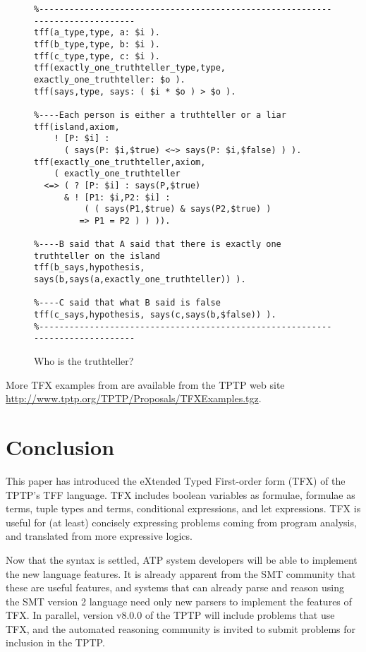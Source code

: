 \documentclass{easychair}
\begin{document}
\begin{figure}[htbp]
\begin{small}
\begin{verbatim}
%------------------------------------------------------------------------------
tff(a_type,type, a: $i ).
tff(b_type,type, b: $i ).
tff(c_type,type, c: $i ).
tff(exactly_one_truthteller_type,type, exactly_one_truthteller: $o ).
tff(says,type, says: ( $i * $o ) > $o ).

%----Each person is either a truthteller or a liar
tff(island,axiom,
    ! [P: $i] :
      ( says(P: $i,$true) <~> says(P: $i,$false) ) ).
tff(exactly_one_truthteller,axiom,
    ( exactly_one_truthteller
  <=> ( ? [P: $i] : says(P,$true)
      & ! [P1: $i,P2: $i] :
          ( ( says(P1,$true) & says(P2,$true) )
         => P1 = P2 ) ) )).

%----B said that A said that there is exactly one truthteller on the island
tff(b_says,hypothesis, says(b,says(a,exactly_one_truthteller)) ).

%----C said that what B said is false
tff(c_says,hypothesis, says(c,says(b,$false)) ).
%------------------------------------------------------------------------------
\end{verbatim}
\end{small}
\caption{Who is the truthteller?}
\label{Truthteller}
\end{figure}

More TFX examples from are available from the TPTP
web site \url{http://www.tptp.org/TPTP/Proposals/TFXExamples.tgz}.

\section{Conclusion}
\label{Conclusion}

This paper has introduced the eXtended Typed First-order form (TFX) of the
TPTP's TFF language.
TFX includes boolean variables as formulae, formulae as terms, tuple types and
terms, conditional expressions, and let expressions.
TFX is useful for (at least) concisely expressing problems coming from 
program analysis, and translated from more expressive logics.

Now that the syntax is settled, ATP system developers will be able to
implement the new language features.
It is already apparent from the SMT community that these are useful features,
and systems that can already parse and reason using the SMT version 2 language 
need only new parsers to implement the features of TFX.
In parallel, version v8.0.0 of the TPTP will include problems that use TFX,
and the automated reasoning community is invited to submit problems for
inclusion in the TPTP.
\end{document}
